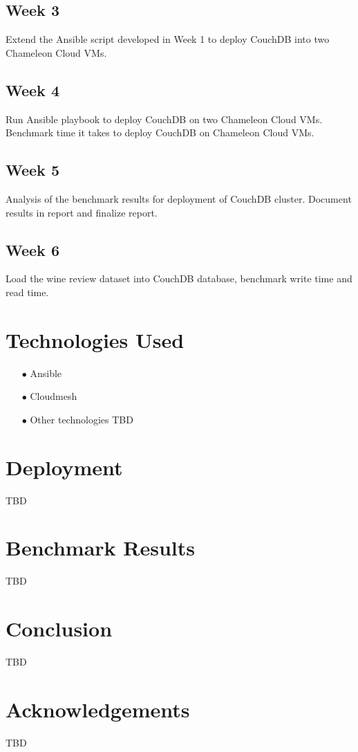 \documentclass[9pt,twocolumn,twoside]{../../styles/osajnl}
\begin{document}
\subsection{Week 3}

Extend the Ansible script developed in Week 1 to deploy CouchDB into
two Chameleon Cloud VMs.

\subsection{Week 4}

Run Ansible playbook to deploy CouchDB on two Chameleon Cloud
VMs. Benchmark time it takes to deploy CouchDB on Chameleon Cloud VMs.

\subsection{Week 5}

Analysis of the benchmark results for deployment of CouchDB
cluster. Document results in report and finalize report.

\subsection{Week 6}

Load the wine review dataset into CouchDB database, benchmark write time
and read time.

\section{Technologies Used}
\begin{itemize}
\item[$\bullet$] Ansible
\item[$\bullet$] Cloudmesh
\item[$\bullet$] Other technologies TBD
\end{itemize}

\section{Deployment}
TBD

\section{Benchmark Results}
TBD

\section{Conclusion}
TBD
\section*{Acknowledgements}

TBD





 
\end{document}
